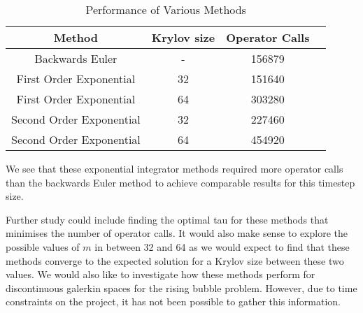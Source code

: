 \begin{table}[H]
    \centering
    \begin{tabular}{| c | c | c | c |}
    \hline
    Method & Krylov size & Operator Calls\\
    \hline
    Backwards Euler & - & 156879 \\
    First Order Exponential & 32 & 151640 \\
    First Order Exponential & 64 & 303280 \\
    Second Order Exponential & 32 & 227460 \\
    Second Order Exponential & 64 & 454920 \\
    \hline
    \end{tabular}
    \caption{Performance of Various Methods}
    \label{tab:reduced_data}
\end{table}

We see that these exponential integrator methods required more operator calls than the backwards Euler method to achieve comparable results for this timestep size.


Further study could include finding the optimal tau for these methods that minimises the number of operator calls.
It would also make sense to explore the possible values of $m$ in between 32 and 64 as we would expect to find that these methods converge to the expected solution for a Krylov size between these two values.
We would also like to investigate how these methods perform for discontinuous galerkin spaces for the rising bubble problem.
However, due to time constraints on the project, it has not been possible to gather this information.

